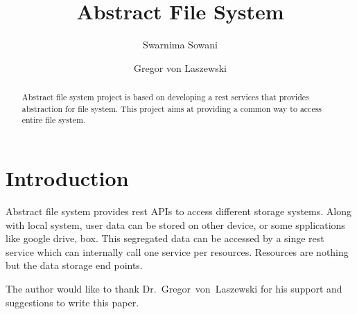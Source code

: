 
\title{Abstract File System}


\author{Swarnima Sowani}

\author{Gregor von Laszewski}


\renewcommand{\shortauthors}{G. v. Laszewski}


\begin{abstract}
Abstract file system project is based on developing a rest services that
provides abstraction for file system.
This project aims at providing a common way to access entire file system. 


\end{abstract}



\maketitle

\section{Introduction}

Abstract file system provides rest APIs to access different storage systems. 
Along with local system, user data can be stored on other device, or some
spplications like google drive, box.
This segregated data can be accessed by a singe rest service which can
internally call one service per resources. Resources are nothing but the data
storage end points.





\begin{acks}

  The author would like to thank Dr.~Gregor~von~Laszewski for his
  support and suggestions to write this paper.

\end{acks}


 

